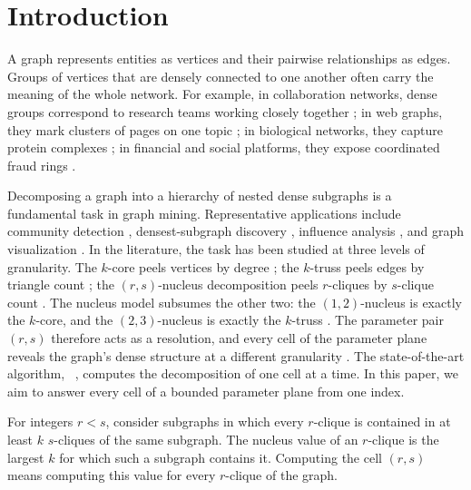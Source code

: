 \section{Introduction}\label{sec:intro}
A graph represents entities as vertices and their pairwise relationships as edges.
%
Groups of vertices that are densely connected to one another often carry the meaning of the whole network.
%
For example, in collaboration networks, dense groups correspond to research teams working closely together \cite{girvan2002community}; in web graphs, they mark clusters of pages on one topic \cite{gibson1998inferring}; in biological networks, they capture protein complexes \cite{sharan2006modeling}; in financial and social platforms, they expose coordinated fraud rings \cite{akoglu2015graph,jiang2016catching}.

Decomposing a graph into a hierarchy of nested dense subgraphs is a fundamental task in graph mining.
%
Representative applications include community detection \cite{girvan2002community,rossetti2019community}, densest-subgraph discovery \cite{tsourakakis2013finding}, influence analysis \cite{kempe2003maximizing,li2015influential}, and graph visualization \cite{malliaros2013clustering}.
%
In the literature, the task has been studied at three levels of granularity.
%
The $k$-core peels vertices by degree \cite{seidman1983network,batagelj2011fast}; the $k$-truss peels edges by triangle count \cite{cohen2008trusses,wang2012truss}; the $(r,s)$-nucleus decomposition peels $r$-cliques by $s$-clique count \cite{firstNucleus}.
%
The nucleus model subsumes the other two: the $(1,2)$-nucleus is exactly the $k$-core, and the $(2,3)$-nucleus is exactly the $k$-truss \cite{firstNucleus}.
%
The parameter pair $(r,s)$ therefore acts as a resolution, and every cell of the parameter plane reveals the graph's dense structure at a different granularity \cite{firstNucleus,nuclearTWEB}.
%
The state-of-the-art algorithm, \cnd~\cite{NuclearCD}, computes the decomposition of one cell at a time.
%
In this paper, we aim to answer every cell of a bounded parameter plane from one index.

For integers $r<s$, consider subgraphs in which every $r$-clique is contained in at least $k$ $s$-cliques of the same subgraph.
%
The nucleus value of an $r$-clique is the largest $k$ for which such a subgraph contains it.
%
Computing the cell $(r,s)$ means computing this value for every $r$-clique of the graph.

